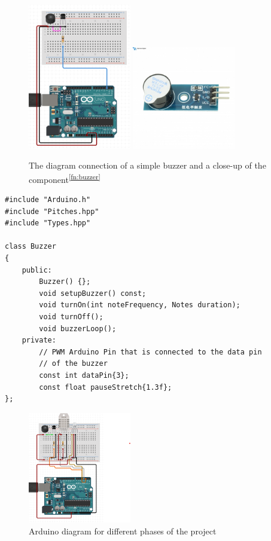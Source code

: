 \documentclass[12pt]{article}
\begin{document}
	\begin{figure}[ht]
		\centering
		\includegraphics[width=0.4\textwidth]{diag_buzzer.png}
		\includegraphics[width=0.4\textwidth]{buzzer.jpg}
		\caption{The diagram connection of a simple buzzer and a close-up of the component\textsuperscript{\ref{fn:buzzer}}}
		\label{fig:buzzer}
	\end{figure}
	
	\begin{lstlisting}
#include "Arduino.h"
#include "Pitches.hpp"
#include "Types.hpp"

class Buzzer
{
	public:
		Buzzer() {};
		void setupBuzzer() const;
		void turnOn(int noteFrequency, Notes duration);
		void turnOff();
		void buzzerLoop();
	private:
		// PWM Arduino Pin that is connected to the data pin
		// of the buzzer
		const int dataPin{3};
		const float pauseStretch{1.3f};
};
	\end{lstlisting}
	
	\begin{figure}[ht]
		\centering
		\includegraphics[width=0.4\textwidth]{diag_full1.png}
		\caption{Arduino diagram for different phases of the project}
		\label{fig:sys_diag}
	\end{figure}
	
\end{document}
